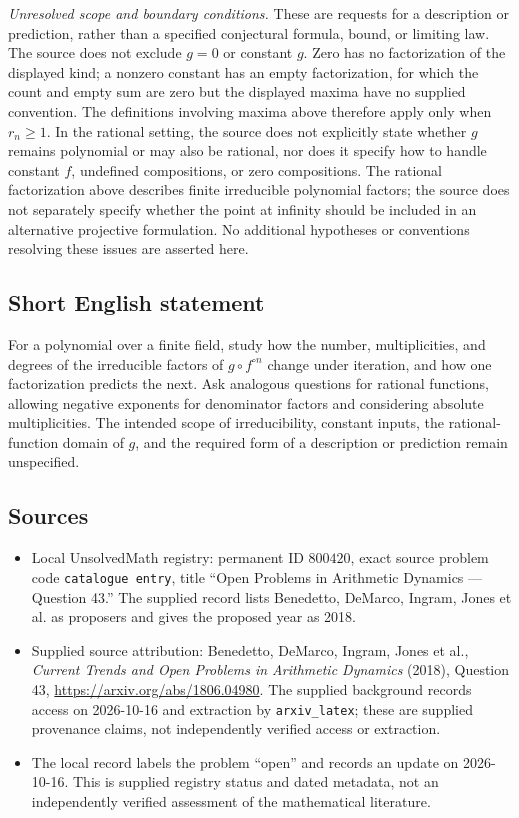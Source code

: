 \documentclass[11pt]{article}
\begin{document}
\textit{Unresolved scope and boundary conditions.} These are requests for a description or prediction, rather than a specified conjectural formula, bound, or limiting law. The source does not exclude \(g=0\) or constant \(g\). Zero has no factorization of the displayed kind; a nonzero constant has an empty factorization, for which the count and empty sum are zero but the displayed maxima have no supplied convention. The definitions involving maxima above therefore apply only when \(r_n\ge1\). In the rational setting, the source does not explicitly state whether \(g\) remains polynomial or may also be rational, nor does it specify how to handle constant \(f\), undefined compositions, or zero compositions. The rational factorization above describes finite irreducible polynomial factors; the source does not separately specify whether the point at infinity should be included in an alternative projective formulation. No additional hypotheses or conventions resolving these issues are asserted here.
\subsection{Short English statement}
For a polynomial over a finite field, study how the number, multiplicities, and degrees of the irreducible factors of \(g\circ f^{\circ n}\) change under iteration, and how one factorization predicts the next. Ask analogous questions for rational functions, allowing negative exponents for denominator factors and considering absolute multiplicities. The intended scope of irreducibility, constant inputs, the rational-function domain of \(g\), and the required form of a description or prediction remain unspecified.
\subsection{Sources}
\begin{itemize}
\item Local UnsolvedMath registry: permanent ID \(800420\), exact source problem code \texttt{catalogue entry}, title ``Open Problems in Arithmetic Dynamics --- Question 43.'' The supplied record lists Benedetto, DeMarco, Ingram, Jones et al. as proposers and gives the proposed year as 2018.
\item Supplied source attribution: Benedetto, DeMarco, Ingram, Jones et al., \emph{Current Trends and Open Problems in Arithmetic Dynamics} (2018), Question 43, \url{https://arxiv.org/abs/1806.04980}. The supplied background records access on 2026-10-16 and extraction by \texttt{arxiv\_latex}; these are supplied provenance claims, not independently verified access or extraction.
\item The local record labels the problem ``open'' and records an update on 2026-10-16. This is supplied registry status and dated metadata, not an independently verified assessment of the mathematical literature.
\end{itemize}
\end{document}
